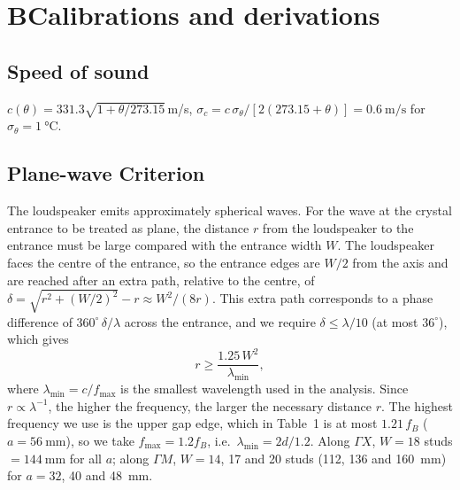 \documentclass[9pt,a4paper,twocolumn]{extarticle}
\begin{document}
\clearpage
\section*{B\quad Calibrations and derivations}
\subsection*{Speed of sound}
$c(\theta)=331.3\sqrt{1+\theta/273.15}$\,m/s, $\sigma_c=c\,\sigma_\theta/[2(273.15+\theta)]=\SI{0.6}{\meter\per\second}$ for $\sigma_\theta=\SI{1}{\celsius}$.

\subsection*{Plane-wave Criterion}
The loudspeaker emits approximately spherical waves. For the wave at the crystal entrance to be treated as plane, the distance $r$ from the loudspeaker to the entrance must be large compared with the entrance width $W$. The loudspeaker faces the centre of the entrance, so the entrance edges are $W/2$ from the axis and are reached after an extra path, relative to the centre, of $\delta = \sqrt{r^2 + (W/2)^2} - r \approx W^2/(8r)$. This extra path corresponds to a phase difference of $360^\circ\,\delta/\lambda$ across the entrance, and we require $\delta \le \lambda/10$ (at most $36^\circ$), which gives
\begin{equation}
  r \ge \frac{1.25\,W^2}{\lambda_{\min}},
\end{equation}
where $\lambda_{\min} = c/f_{\max}$ is the smallest wavelength used in the analysis. Since $r \propto \lambda^{-1}$, the higher the frequency, the larger the necessary distance $r$. The highest frequency we use is the upper gap edge, which in Table~1 is at most $1.21\,f_B$ ($a = \SI{56}{\milli\metre}$), so we take $f_{\max} = 1.2 f_B$, i.e.\ $\lambda_{\min} = 2d/1.2$. Along $\Gamma X$, $W = 18$ studs $= \SI{144}{\milli\metre}$ for all $a$; along $\Gamma M$, $W = 14$, 17 and 20 studs (112, 136 and \SI{160}{\milli\metre}) for $a = 32$, 40 and \SI{48}{\milli\metre}.
\end{document}
